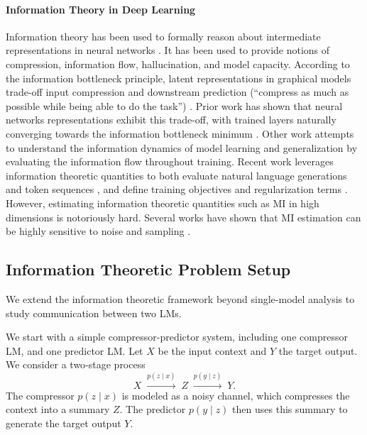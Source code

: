 \documentclass{article} %
\begin{document}
\paragraph{Information Theory in Deep Learning} 
Information theory has been used to formally reason about intermediate representations in neural networks \citep{Farquhar2024DetectingHI, gardner1988, kawaguchi2023does, morris2025languagemodelsmemorize, saxe2019, tishby2015deep}.
It has been used to provide notions of compression, information flow, hallucination, and model capacity.
According to the information bottleneck principle, latent representations in graphical models trade-off input compression and downstream prediction (``compress as much as possible while being able to do the task'') \citep{tishby2000information}. 
Prior work has shown that neural networks representations exhibit this trade-off, with trained layers naturally converging towards the information bottleneck minimum \citep{shwartz2017opening, tishby2015deep}.
Other work attempts to understand the information dynamics of model learning and generalization \citep{goldfeld2020information, kawaguchi2023does, saxe2019, shwartz2017opening, westphal2025generalized} by evaluating the information flow throughout training.
Recent work leverages information theoretic quantities to both evaluate natural language generations and token sequences \citep{arda2025rate, darrin-etal-2024-cosmic,franken2024self, shani2025tokens}, and define training objectives and regularization terms \citep{chen2016infogan, goldfeld2020information, hjelm2018learning, kirsch2020unpacking, oord2018representation, wang2020infobert}.
However, estimating information theoretic quantities such as MI in high dimensions is notoriously hard. Several works have shown that MI estimation can be highly sensitive to noise and sampling \citep{belghazi2018mine, mcallester2020formal, paninski2003mi, saxe2019}.

\subsection{Information Theoretic Problem Setup}
\label{sec:info-theoretic-setup}
We extend the information theoretic framework beyond single-model analysis to study communication between two LMs.

We start with a simple compressor-predictor system, including one compressor LM, and one predictor LM.
Let $X$ be the input context and $Y$ the target output. We consider a two‐stage process
\[
X \;\xrightarrow{p(z\mid x)}\; Z \;\xrightarrow{p(y\mid z)}\; Y.
\]
The compressor $p(z\mid x)$ is modeled as a noisy channel, which compresses the context into a summary \(Z\). The predictor $p(y\mid z)$ then uses this summary to generate the target output \(Y\). 
\end{document}

